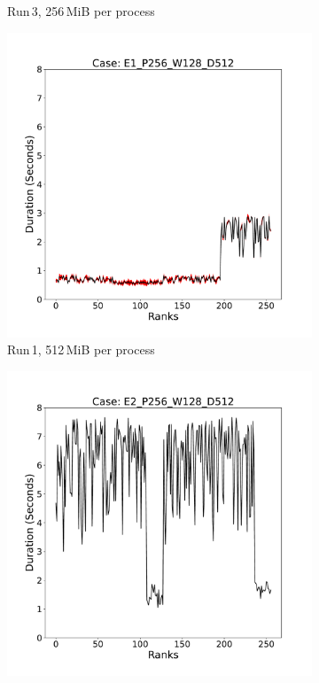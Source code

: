 \begin{figure}[h!]
\begin{subfigure}[b]{0.3\textwidth}
         \caption{Run\,3, 256\,MiB per process}
         \label{fig:E3_256}
     \end{subfigure}
     \vfill
          \begin{subfigure}[b]{0.3\textwidth}
         \centering
         \includegraphics[width=\textwidth, height=\textwidth]{figures/E1_P256_W128_D512.pdf}
         \caption{Run\,1, 512\,MiB per process}
         \label{fig:E1_512}
     \end{subfigure}
     \hfill
     \begin{subfigure}[b]{0.3\textwidth}
         \centering
         \includegraphics[width=\textwidth, height=\textwidth]{figures/E2_P256_W128_D512.pdf}

\end{subfigure}
\end{figure}
